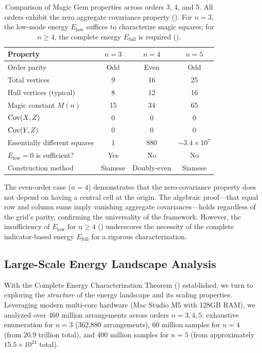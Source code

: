 \begin{table}[H]
\centering
\begin{tabular}{lccc}
\toprule
Property & $n = 3$ & $n = 4$ & $n = 5$ \\
\midrule
Order parity & Odd & Even & Odd \\
Total vertices & 9 & 16 & 25 \\
Hull vertices (typical) & 8 & 12 & 16 \\
Magic constant $M(n)$ & 15 & 34 & 65 \\
$\mathrm{Cov}(X, Z)$ & 0 & 0 & 0 \\
$\mathrm{Cov}(Y, Z)$ & 0 & 0 & 0 \\
Essentially different squares & 1 & 880 & $\sim 3.4 \times 10^7$ \\
$E_{\mathrm{low}}=0$ is sufficient? & Yes & No & No \\
Construction method & Siamese & Doubly-even & Siamese \\
\bottomrule
\end{tabular}
\caption{Comparison of Magic Gem properties across orders 3, 4, and 5.
All orders exhibit the zero aggregate covariance property ().
For $n=3$, the low-mode energy $E_{\mathrm{low}}$ suffices to characterize magic squares;
for $n \geq 4$, the complete energy $E_{\mathrm{full}}$ is required ().}
\label{tab:comparison_all}
\end{table}

The even-order case ($n = 4$) demonstrates that the zero-covariance property
does not depend on having a central cell at the origin.
The algebraic proof---that equal row and column sums imply vanishing aggregate covariances---holds 
regardless of the grid's parity, confirming the universality of the framework.
However, the insufficiency of $E_{\mathrm{low}}$ for $n \geq 4$ ()
underscores the necessity of the complete indicator-based energy $E_{\mathrm{full}}$ for a rigorous characterization.

\subsection{Large-Scale Energy Landscape Analysis}
\label{sec:large_scale_landscape}

With the Complete Energy Characterization Theorem () established,
we turn to exploring the \emph{structure} of the energy landscape and its scaling properties.
Leveraging modern multi-core hardware (Mac Studio M5 with 128GB RAM),
we analyzed over 460 million arrangements across orders $n = 3, 4, 5$:
exhaustive enumeration for $n = 3$ (362,880 arrangements),
60 million samples for $n = 4$ (from 20.9 trillion total),
and 400 million samples for $n = 5$ (from approximately $15.5 \times 10^{24}$ total).

